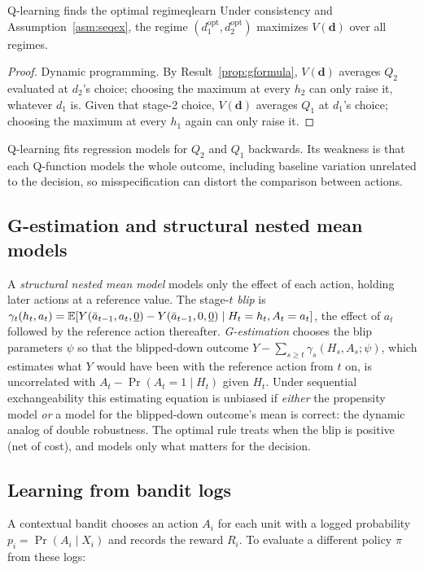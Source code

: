 \documentclass[11pt]{article}
\begin{document}
\begin{prop}{Q-learning finds the optimal regime}{qlearn}
Under consistency and Assumption~\ref{asm:seqex}, the regime $(d_1^{\text{opt}}, d_2^{\text{opt}})$ maximizes $V(\mathbf d)$ over all
regimes.
\end{prop}
\begin{proof}
Dynamic programming. By Result~\ref{prop:gformula}, $V(\mathbf d)$ averages $Q_2$ evaluated at $d_2$'s choice; choosing the maximum at
every $h_2$ can only raise it, whatever $d_1$ is. Given that stage-2 choice, $V(\mathbf d)$ averages $Q_1$ at $d_1$'s choice;
choosing the maximum at every $h_1$ again can only raise it.
\end{proof}

Q-learning fits regression models for $Q_2$ and $Q_1$ backwards. Its weakness is that each Q-function models the whole
outcome, including baseline variation unrelated to the decision, so misspecification can distort the comparison between
actions.

\subsection{G-estimation and structural nested mean models}

A \emph{structural nested mean model} models only the effect of each action, holding later actions at a reference value. The
stage-$t$ \emph{blip} is $\gamma_t(h_t, a_t) = \mathbb{E}[Y(\bar a_{t-1}, a_t, \underline 0) - Y(\bar a_{t-1}, 0, \underline 0) \mid H_t = h_t, A_t = a_t]$, the
effect of $a_t$ followed by the reference action thereafter. \emph{G-estimation} chooses the blip parameters $\psi$ so that the
blipped-down outcome $Y - \sum_{s \ge t}\gamma_s(H_s, A_s; \psi)$, which estimates what $Y$ would have been with the reference
action from $t$ on, is uncorrelated with $A_t - \Pr(A_t = 1 \mid H_t)$ given $H_t$. Under sequential exchangeability this
estimating equation is unbiased if \emph{either} the propensity model \emph{or} a model for the blipped-down outcome's mean is
correct: the dynamic analog of double robustness. The optimal rule treats when the blip is positive (net of cost), and
models only what matters for the decision.

\subsection{Learning from bandit logs}

A contextual bandit chooses an action $A_i$ for each unit with a logged probability $p_i = \Pr(A_i \mid X_i)$ and records the
reward $R_i$. To evaluate a different policy $\pi$ from these logs:
\end{document}
